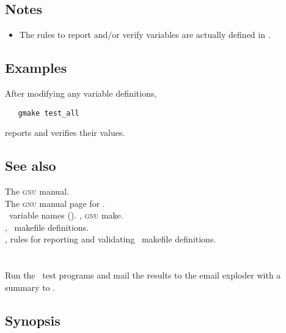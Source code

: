 \subsection*{Notes}

\begin{itemize}
\item
   The rules to report and/or verify  variables are actually
   defined in .
\end{itemize}

\subsection*{Examples}

After modifying any  variable definitions, 

\begin{verbatim}
   gmake test_all
\end{verbatim}

\noindent
reports and verifies their values.

\subsection*{See also}

The \textsc{gnu}  manual.\\
The \textsc{gnu} manual page for .\\
\aipspp\ variable names ().
, \textsc{gnu} make.\\
, \aipspp\ makefile definitions.\\
, rules for reporting and validating \aipspp\ makefile
   definitions.

 
\newpage
\section{}
\label{runtests}
 
Run the \aipspp\ test programs and mail the results to the 
email exploder with a summary to .
 
\subsection*{Synopsis}
 
